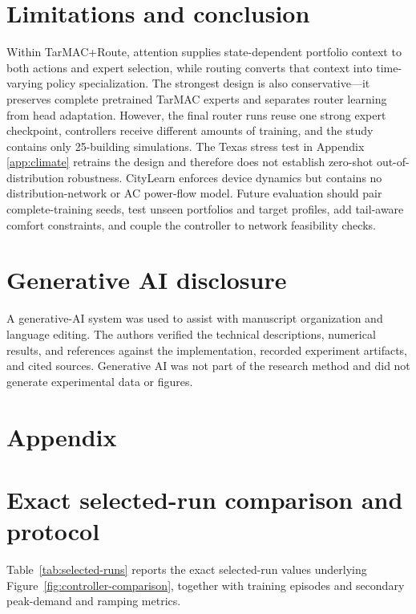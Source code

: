 \documentclass{article}
\begin{document}
\section{Limitations and conclusion}


Within TarMAC+Route, attention supplies state-dependent portfolio context to
both actions and expert selection, while routing converts
that context into time-varying policy specialization. The strongest design is
also conservative---it preserves complete pretrained TarMAC experts and
separates router learning from head adaptation. However, the final router runs
reuse one strong expert checkpoint, controllers receive different amounts of
training, and the study contains only 25-building simulations. The Texas stress test in Appendix
\ref{app:climate} retrains the design and therefore does not establish
zero-shot out-of-distribution robustness. CityLearn enforces device dynamics
but contains no distribution-network or AC power-flow model. Future evaluation
should pair complete-training seeds, test unseen portfolios and target
profiles, add tail-aware comfort constraints, and couple the controller to
network feasibility checks.


\section*{Generative AI disclosure}
A generative-AI system was used to assist with manuscript organization and
language editing. The authors verified the technical descriptions, numerical
results, and references against the implementation, recorded experiment
artifacts, and cited sources. Generative AI was not part of the research method
and did not generate experimental data or figures.





\clearpage
\appendix
\section*{Appendix}
\section{Exact selected-run comparison and protocol}
\label{app:protocol}

Table~\ref{tab:selected-runs} reports the exact selected-run values underlying
Figure~\ref{fig:controller-comparison}, together with training episodes and
secondary peak-demand and ramping metrics.
\end{document}
